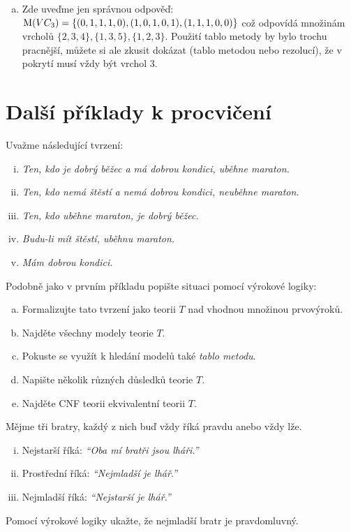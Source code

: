 \documentclass[a4paper,11pt]{amsart}
\begin{document}
\begin{problem}
\begin{solution}
\begin{enumerate}[(a)]
            \item Zde uveďme jen správnou odpověď: $\operatorname{M}(VC_3)=\{(0,1,1,1,0),(1,0,1,0,1),(1,1,1,0,0)\}$ což odpovídá množinám vrcholů $\{2,3,4\},\{1,3,5\},\{1,2,3\}$. Použití tablo metody by bylo trochu pracnější, můžete si ale zkusit dokázat (tablo metodou nebo rezolucí), že v pokrytí musí vždy být vrchol 3.
        \end{enumerate}
    \end{solution}

\end{problem}


\section*{Další příklady k procvičení}


\begin{problem}
    
    Uvažme následující tvrzení:
    \begin{enumerate}[(i)]
        \item {\it Ten, kdo je dobrý běžec a má dobrou kondici, uběhne maraton.}
        \item {\it Ten, kdo nemá štěstí a nemá dobrou kondici, neuběhne maraton.}
        \item {\it Ten, kdo uběhne maraton, je dobrý běžec.}
        \item {\it Budu-li mít štěstí, uběhnu maraton.}
        \item {\it Mám dobrou kondici.}
    \end{enumerate}
    Podobně jako v prvním příkladu popište situaci pomocí výrokové logiky:
    \begin{enumerate}[(a)]
        \item Formalizujte tato tvrzení jako teorii $T$ nad vhodnou množinou prvovýroků.
        \item Najděte všechny modely teorie $T$. 
        \item Pokuste se využít k hledání modelů také \emph{tablo metodu}.
        \item Napište několik různých důsledků teorie $T$.
        \item Najděte CNF teorii ekvivalentní teorii $T$.
    \end{enumerate}
    
\end{problem}


\begin{problem}

    Mějme tři bratry, každý z nich buď vždy říká pravdu anebo vždy lže.
    \begin{enumerate}[(i)]
        \item Nejstarší říká: \emph{``Oba mí bratři jsou lháři.''}
        \item Prostřední říká: \emph{``Nejmladší je lhář.''}
        \item Nejmladší říká: \emph{``Nejstarší je lhář.''}
    \end{enumerate}
    Pomocí výrokové logiky ukažte, že nejmladší bratr je pravdomluvný.
     
\end{problem}
\end{document}

